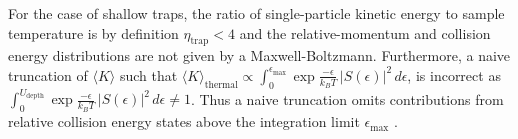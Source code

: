 
For the case of shallow traps, the ratio of single-particle kinetic energy to sample temperature is by definition $\eta_\text{trap} < 4$ and the relative-momentum and collision energy distributions are not given by a Maxwell-Boltzmann.
Furthermore, a naive truncation of $\langle K \rangle$ such that $\langle K \rangle_\text{thermal} \propto \displaystyle \int_0^{\epsilon_\text{max}} \exp{\frac{-\epsilon}{k_B T}}\,\vert S(\epsilon) \vert^2 \, d\epsilon$, is incorrect as $\displaystyle \int_0^{U_\text{depth}} \exp{\frac{-\epsilon}{k_B T}}\,\vert S(\epsilon) \vert^2 \,d\epsilon \neq 1$. 
Thus a naive truncation omits contributions from relative collision energy states above the integration limit $\epsilon_\text{max}$ \cite{MartinezDeEscobar2008}.


